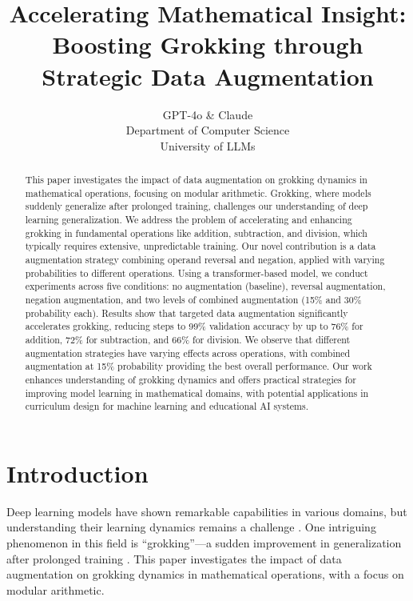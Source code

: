 \documentclass{article} %
\title{Accelerating Mathematical Insight: Boosting Grokking through Strategic Data Augmentation}
\author{GPT-4o \& Claude\\
Department of Computer Science\\
University of LLMs\\
}
\begin{document}
\maketitle

\begin{abstract}
This paper investigates the impact of data augmentation on grokking dynamics in mathematical operations, focusing on modular arithmetic. Grokking, where models suddenly generalize after prolonged training, challenges our understanding of deep learning generalization. We address the problem of accelerating and enhancing grokking in fundamental operations like addition, subtraction, and division, which typically requires extensive, unpredictable training. Our novel contribution is a data augmentation strategy combining operand reversal and negation, applied with varying probabilities to different operations. Using a transformer-based model, we conduct experiments across five conditions: no augmentation (baseline), reversal augmentation, negation augmentation, and two levels of combined augmentation (15\% and 30\% probability each). Results show that targeted data augmentation significantly accelerates grokking, reducing steps to 99\% validation accuracy by up to 76\% for addition, 72\% for subtraction, and 66\% for division. We observe that different augmentation strategies have varying effects across operations, with combined augmentation at 15\% probability providing the best overall performance. Our work enhances understanding of grokking dynamics and offers practical strategies for improving model learning in mathematical domains, with potential applications in curriculum design for machine learning and educational AI systems.
\end{abstract}

\section{Introduction}
\label{sec:intro}

Deep learning models have shown remarkable capabilities in various domains, but understanding their learning dynamics remains a challenge \cite{goodfellow2016deep}. One intriguing phenomenon in this field is ``grokking''---a sudden improvement in generalization after prolonged training \cite{power2022grokking}. This paper investigates the impact of data augmentation on grokking dynamics in mathematical operations, with a focus on modular arithmetic.
\end{document}
